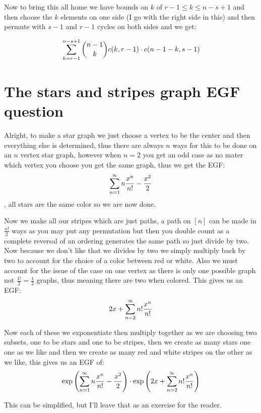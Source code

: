 \documentclass{article}
\theoremstyle{definition}
\begin{document}
	Now to bring this all home we have bounds on $k$ of $r-1 \le k \le n-s+1$ and then choose the $k$ elements on one side (I go with the right side in this) and then permute with $s-1$ and $r-1$ cycles on both sides and we get:
	
	$$\sum\limits_{k=r-1}^{n-s+1}  {\binom{n-1}{k} c(k,r-1) \cdot c(n-1-k,s-1)} $$
	
	\section{The stars and stripes graph EGF question}
	
	Alright, to make a star graph we just choose a vertex to be the center and then everything else is determined, thus there are always $n$ ways for this to be done on an $n$ vertex star graph, however when $n=2$ you get an odd case as no mater which vertex you choose you get the same graph, thus we get the EGF:$$ \sum\limits_{n=1}^{\infty}  {n\frac{x^n}{n!}}  - \frac{x^2}2 $$, all stars are the same color so we are now done.
	
	Now we make all our stripes which are just paths, a path on $[n]$ can be made in $\frac{n!}2$ ways as you may put any permutation but then you double count as a complete reversal of an ordering generates the same path so just divide by two. Now because we don't like that we divides by two we simply multiply back by two to account for the choice of a color between red or white. Also we must account for the issue of the case on one vertex as there is only one possible graph not $\frac{1!}2 = \frac 12$ graphs, thus meaning there are two when colored. This gives us an EGF: $$2x + \sum\limits_{n=2}^{\infty}  {n!\frac{x^n}{n!}} $$
	
	Now each of these we exponentiate then multiply together as we are choosing two subsets, one to be stars and one to be stripes, then we create as many stars one one as we like and then we create as many red and white stripes on the other as we like, this gives us an EGF of: \begin{align*}
		\exp\left(\sum\limits_{n=1}^{\infty}  {n\frac{x^n}{n!}} -\frac{x^2}2\right)\cdot\exp\left(2x+\sum\limits_{n=2}^{\infty}  {n!\frac{x^n}{n!}} \right)
	\end{align*}
	
	This can be simplified, but I'll leave that as an exercise for the reader.
	
\end{document}
